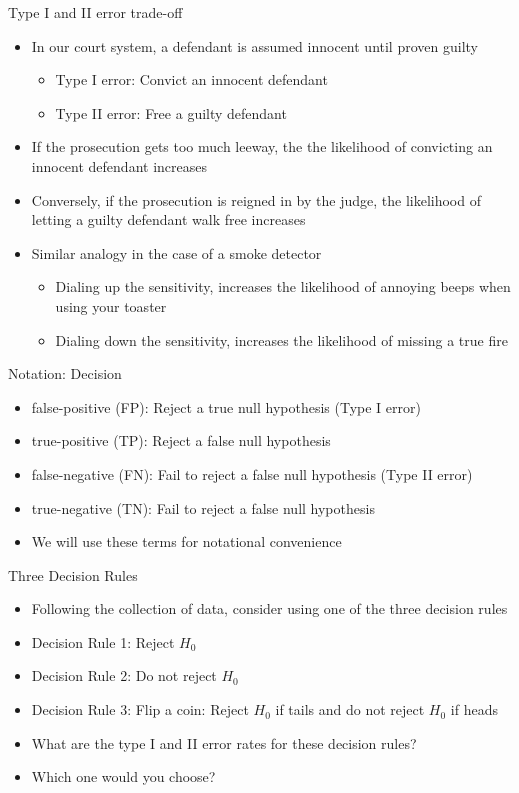\documentclass[xcolor=x11names,compress]{beamer}\usepackage[]{graphicx}\usepackage[]{color}
\begin{document}
\begin{frame}{Type I and II error trade-off}
  \begin{itemize}
  \item In our court system, a defendant is assumed innocent until proven guilty 
    \begin{itemize}
    \item Type I error: Convict an innocent defendant
    \item Type II error: Free a guilty defendant
    \end{itemize}
  \item If the prosecution gets too much leeway, the the likelihood of convicting an
        innocent defendant increases
  \item Conversely, if the prosecution is reigned in by the judge, the likelihood of letting a guilty defendant walk
        free increases
  \item Similar analogy in the case of a smoke detector
    \begin{itemize}
    \item Dialing up the sensitivity, increases the likelihood of annoying beeps when using your toaster
    \item Dialing down the sensitivity, increases the likelihood of missing a true fire
    \end{itemize}
  \end{itemize}
\end{frame}

\begin{frame}{Notation: Decision}
  \begin{itemize}
  \item false-positive (FP): Reject a true null hypothesis (Type I error)
  \item true-positive (TP): Reject a false null hypothesis
  \item false-negative (FN): Fail to reject a false null hypothesis (Type II error)
  \item true-negative (TN): Fail to reject a false null hypothesis
   \item We will use these terms for notational convenience
  \end{itemize}
\end{frame}


\begin{frame}{Three Decision Rules}
  \begin{itemize}
  \item Following the collection of data, consider using one of the
        three decision rules
  \item Decision Rule 1: Reject $H_0$
  \item Decision Rule 2: Do not reject $H_0$
  \item Decision Rule 3: Flip a coin: Reject $H_0$ if tails and do not reject $H_0$ if heads
  \item What are the type I and II error rates for these decision rules?
  \item Which one would you choose?
  \end{itemize}
\end{frame}
\end{document}
